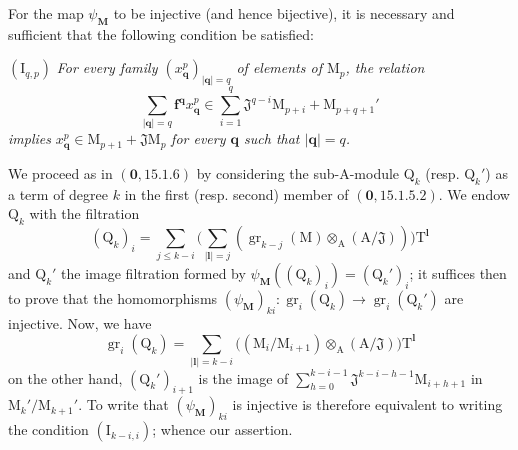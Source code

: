 \begin{env}[19.5.5.1]
\label{IV.19.5.5.1}
For the map $\psi_\mathbf{M}$ to be injective (and hence bijective), it is necessary and sufficient that the following condition be satisfied:

$(\mathrm{I}_{q,p})$ \emph{For every family $(x_\mathbf{q}^p)_{|\mathbf{q}|=q}$ of elements of $\mathrm{M}_p$, the relation}
\[
  \textstyle\sum_{|\mathbf{q}|=q}\mathbf{f}^\mathbf{q} x_\mathbf{q}^p\in\textstyle\sum_{i=1}^{q}\mathfrak{J}^{q-i}\mathrm{M}_{p+i}+\mathrm{M}_{p+q+1}'
\]
\emph{implies} $x_\mathbf{q}^p\in\mathrm{M}_{p+1}+\mathfrak{J}\mathrm{M}_p$ \emph{for every $\mathbf{q}$ such that $|\mathbf{q}|=q$.}

We proceed as in $(\mathbf{0},15.1.6)$ by considering the sub-$\mathrm{A}$-module $\mathrm{Q}_k$ (resp. $\mathrm{Q}_k'$) as a term of degree $k$ in the first (resp. second) member of $(\mathbf{0},15.1.5.2)$. We endow $\mathrm{Q}_k$ with the filtration
\[
  (\mathrm{Q}_k)_i=\textstyle\sum_{j\leqslant k-i}\bigl(\textstyle\sum_{|\mathbf{l}|=j}(\operatorname{gr}_{k-j}(\mathrm{M})\otimes_\mathrm{A}(\mathrm{A}/\mathfrak{J}))\bigr)\mathrm{T}^\mathbf{l}
\]
and $\mathrm{Q}_k'$ the image filtration formed by $\psi_\mathbf{M}((\mathrm{Q}_k)_i)=(\mathrm{Q}_k')_i$; it suffices then to prove that the homomorphisms $(\psi_\mathbf{M})_{ki}:\operatorname{gr}_i(\mathrm{Q}_k)\to\operatorname{gr}_i(\mathrm{Q}_k')$ are injective. Now, we have
\[
  \operatorname{gr}_i(\mathrm{Q}_k)=\textstyle\sum_{|\mathbf{l}|=k-i}\bigl((\mathrm{M}_i/\mathrm{M}_{i+1})\otimes_\mathrm{A}(\mathrm{A}/\mathfrak{J})\bigr)\mathrm{T}^\mathbf{l}
\]
on the other hand, $(\mathrm{Q}_k')_{i+1}$ is the image of $\sum_{h=0}^{k-i-1}\mathfrak{J}^{k-i-h-1}\mathrm{M}_{i+h+1}$ in $\mathrm{M}_k'/\mathrm{M}_{k+1}'$. To write that $(\psi_\mathbf{M})_{ki}$ is injective is therefore equivalent to writing the condition $(\mathrm{I}_{k-i,i})$; whence our assertion.
\end{env}


